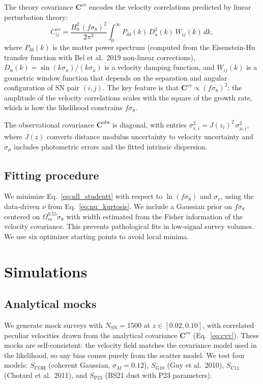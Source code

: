 \documentclass[fleqn,usenatbib]{mnras}
\begin{document}
The theory covariance $\bm{C}^{vv}$ encodes the velocity
correlations predicted by linear perturbation theory:
\begin{equation}
C^{vv}_{ij} = \frac{H_0^2\,(f\sigma_8)^2}{2\pi^2}
\int_0^\infty P_{\delta\delta}(k)\,D_u^2(k)\,W_{ij}(k)\,dk,
\label{eq:cvv}
\end{equation}
where $P_{\delta\delta}(k)$ is the matter power spectrum (computed
from the Eisenstein-Hu transfer function with Bel et al.\ 2019
non-linear corrections), $D_u(k) = \sin(k\sigma_u)/(k\sigma_u)$
is a velocity damping function, and $W_{ij}(k)$ is a geometric
window function that depends on the separation and angular
configuration of SN pair $(i,j)$. The key feature is that
$\bm{C}^{vv} \propto (f\sigma_8)^2$: the amplitude of the
velocity correlations scales with the square of the growth rate,
which is how the likelihood constrains $f\sigma_8$.

The observational covariance $\bm{C}^\mathrm{obs}$ is diagonal,
with entries $\sigma_{v,i}^2 = J(z_i)^2\,\sigma_{\mu,i}^2$, where
$J(z)$ converts distance modulus uncertainty to velocity uncertainty
and $\sigma_\mu$ includes photometric errors and the fitted
intrinsic dispersion.

\subsection{Fitting procedure}

We minimize Eq.~\ref{eq:nll_studentt} with respect to
$\ln(f\sigma_8)$ and $\sigma_v$, using the data-driven $\nu$ from
Eq.~\ref{eq:nu_kurtosis}. We include a Gaussian prior on
$f\sigma_8$ centered on $\Omega_m^{0.55}\sigma_8$ with width
estimated from the Fisher information of the velocity covariance.
This prevents pathological fits in low-signal survey volumes. We
use six optimizer starting points to avoid local minima.

\section{Simulations}
\label{sec:sims}

\subsection{Analytical mocks}

We generate mock surveys with $N_\mathrm{SN} = 1500$ at
$z \in [0.02, 0.10]$, with correlated peculiar velocities drawn
from the analytical covariance $\bm{C}^{vv}$ (Eq.~\ref{eq:cvv}).
These mocks are self-consistent: the velocity field matches the
covariance model used in the likelihood, so any bias comes purely
from the scatter model. We test four models: $S_\mathrm{COH}$
(coherent Gaussian, $\sigma_M = 0.12$), $S_\mathrm{G10}$ (Guy et
al.\ 2010), $S_\mathrm{C11}$ (Chotard et al.\ 2011), and
$S_\mathrm{P23}$ (BS21 dust with P23 parameters).
\end{document}
